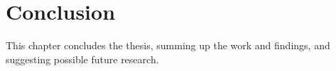 \chapter{Conclusion}
This chapter concludes the thesis, summing up the work and findings, and suggesting possible future research.
